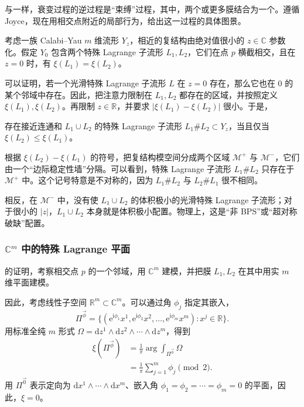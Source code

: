 与一样，衰变过程的逆过程是“束缚”过程，其中，两个或更多膜结合为一个。遵循 Joyce，现在用相交点附近的局部行为，给出这一过程的具体图景。

考虑一族 Calabi--Yau $m$ 维流形 $Y_z$，相近的复结构由绝对值很小的 $z\in\mathbb{C}$ 参数化。假定 $Y_0$ 包含两个特殊 Lagrange 子流形 $L_1,L_2$，它们在点 $p$ 横截相交，且在 $z=0$ 时，有 $\xi(L_1)=\xi(L_2)$。

可以证明，若一个光滑特殊 Lagrange 子流形 $L$ 在 $z=0$ 存在，那么它也在 $0$ 的某个邻域中存在。因此，把注意力限制在 $L_1,L_2$ 都存在的区域，并按照定义 $\xi(L_1),\xi(L_2)$。再限制 $z\in\mathbb{R}$，并要求 $|\xi(L_1)-\xi(L_2)|$ 很小。于是，
\begin{theorem}\label{thm:5.5}
存在接近连通和 $L_1\cup L_2$ 的特殊 Lagrange 子流形 $L_1\#L_2\subset Y_z$，当且仅当 $\xi(L_2)\le\xi(L_1)$。
\end{theorem}

根据 $\xi(L_2)-\xi(L_1)$ 的符号，把复结构模空间分成两个区域 $\mathcal{M}^+$ 与 $\mathcal{M}^-$，它们由一个“边际稳定性墙”分隔。可以看到，特殊 Lagrange 子流形 $L_1\#L_2$ 只存在于 $\mathcal{M}^+$ 中。这个记号特意是不对称的，因为 $L_1\#L_2$ 与 $L_2\#L_1$ 很不相同。

相反，在 $\mathcal{M}^-$ 中，没有使 $L_1\cup L_2$ 的体积极小的光滑特殊 Lagrange 子流形；对于很小的 $|z|$，$L_1\cup L_2$ 本身就是体积极小配置。物理上，这是“非 BPS”或“超对称破缺”配置。

\subsubsection{\texorpdfstring{$\mathbb{C}^m$}{ℂᵐ} 中的特殊 Lagrange 平面}\label{sec:5.2.1.3}

的证明，考察相交点 $p$ 的一个邻域，用 $\mathbb{C}^m$ 建模，并把膜 $L_1,L_2$ 在其中用实 $m$ 维平面建模。

因此，考虑线性子空间 $\mathbb{R}^m\subset\mathbb{C}^m$。可以通过角 $\phi_j$ 指定其嵌入，
\begin{equation}\label{eq:5.21}
\Pi^{\vec\phi}
=\{(\mathrm{e}^{\mathrm{i}\phi_1}x^1,\mathrm{e}^{\mathrm{i}\phi_2}x^2,
\ldots,\mathrm{e}^{\mathrm{i}\phi_m}x^m):x^j\in\mathbb{R}\}.
\end{equation}
用标准全纯 $m$ 形式 $\Omega=\mathrm{d}z^1\wedge\mathrm{d}z^2\wedge\cdots\wedge\mathrm{d}z^m$，得到
\begin{equation}\label{eq:5.22}
\begin{aligned}
\xi(\Pi^{\vec\phi})
&=\frac{1}{\pi}\arg\int_{\Pi^{\vec\phi}}\Omega\\
&=\frac{1}{\pi}\sum_{j=1}^m\phi_j\pmod 2.
\end{aligned}
\end{equation}
用 $\Pi^{\vec 0}$ 表示定向为 $\mathrm{d}x^1\wedge\cdots\wedge\mathrm{d}x^m$、嵌入角 $\phi_1=\phi_2=\cdots=\phi_m=0$ 的平面，因此，$\xi=0$。


